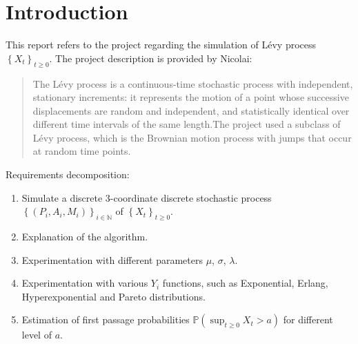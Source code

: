 \section{Introduction}
This report refers to the project regarding the simulation of Lévy process $\left\{X_{t}\right\}_{t \geq 0}$. The project description is provided by Nicolai:
\blockquote{The Lévy process is a continuous-time stochastic process with independent, stationary increments: it represents the motion of a point whose successive displacements are random and independent, and statistically identical over different time intervals of the same length.The project used a subclass of Lévy process, which is the Brownian motion process with jumps that occur at random time points.\cite{Brownian}}

Requirements decomposition:
\begin{enumerate}
\item Simulate a discrete 3-coordinate discrete stochastic process $\left\{\left(P_{i}, A_{i}, M_{i}\right)\right\}_{i \in \mathbb{N}}$ of $\left\{X_{t}\right\}_{t \geq 0}$.
\item Explanation of the algorithm.
\item Experimentation with different parameters $\mu$, $\sigma$, $\lambda$.
\item Experimentation with various $Y_i$ functions, such as Exponential, Erlang, Hyperexponential and Pareto distributions.
\item Estimation of first passage probabilities $\mathbb{P}\left(\sup _{t \geq 0} X_{t}>a\right)$ for different level of $a$. 
\end{enumerate}
\newpage

